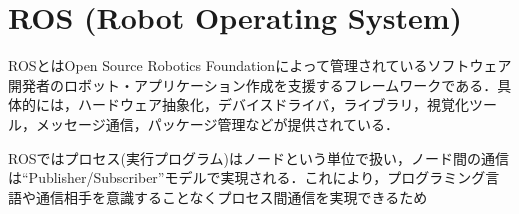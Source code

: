 \documentclass[10pt,a4j]{jarticle}
\begin{document}
\section{ROS (Robot Operating System)}
ROSとはOpen Source Robotics Foundationによって管理されているソフトウェア開発者のロボット・アプリケーション作成を支援するフレームワークである．具体的には，ハードウェア抽象化，デバイスドライバ，ライブラリ，視覚化ツール，メッセージ通信，パッケージ管理などが提供されている．

ROSではプロセス(実行プログラム)はノードという単位で扱い，ノード間の通信は``Publisher/Subscriber''モデルで実現される．これにより，プログラミング言語や通信相手を意識することなくプロセス間通信を実現できるため
\end{document}
